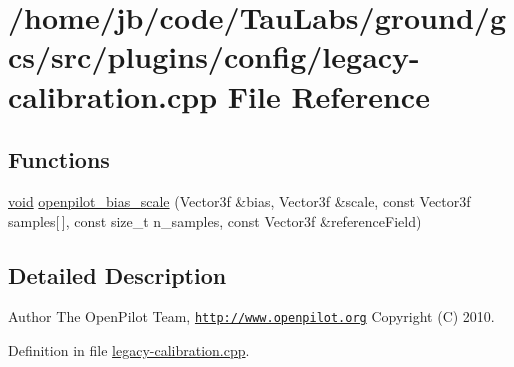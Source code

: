 \hypertarget{legacy-calibration_8cpp}{\section{/home/jb/code/\-Tau\-Labs/ground/gcs/src/plugins/config/legacy-\/calibration.cpp \-File \-Reference}
\label{legacy-calibration_8cpp}
}
\subsection*{\-Functions}
\begin{DoxyCompactItemize}
\item 
\hyperlink{group___u_a_v_objects_plugin_ga444cf2ff3f0ecbe028adce838d373f5c}{void} \hyperlink{group___config_plugin_ga0b4a9c7b3d9017c7ddef423745b54f68}{openpilot\-\_\-bias\-\_\-scale} (\-Vector3f \&bias, \-Vector3f \&scale, const \-Vector3f samples\mbox{[}$\,$\mbox{]}, const size\-\_\-t n\-\_\-samples, const \-Vector3f \&reference\-Field)
\end{DoxyCompactItemize}


\subsection{\-Detailed \-Description}
\begin{DoxyAuthor}{\-Author}
\-The \-Open\-Pilot \-Team, \href{http://www.openpilot.org}{\tt http\-://www.\-openpilot.\-org} \-Copyright (\-C) 2010. 
\end{DoxyAuthor}


\-Definition in file \hyperlink{legacy-calibration_8cpp_source}{legacy-\/calibration.\-cpp}.

